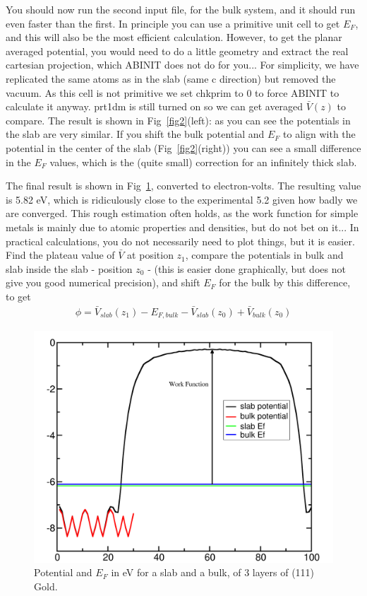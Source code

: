 \documentclass{report}
\begin{document}
You should now run the second input file, for the bulk system, and it should run even faster than the first. In principle you can use a primitive unit cell to get $E_F$, and this will also be the most efficient calculation. However, to get the planar averaged potential, you would need to do a little geometry and extract the real cartesian projection, which ABINIT does not do for you... For simplicity, we have replicated the same atoms as in the slab (same c direction) but removed the vacuum. As this cell is not primitive we set chkprim to 0 to force ABINIT to calculate it anyway. prt1dm is still turned on so we can get averaged $\bar{V}(z)$ to compare. The result is shown in Fig~\ref{fig2}(left): as you can see the potentials in the slab are very similar. If you shift the bulk potential and $E_F$ to align with the potential in the center of the slab (Fig~\ref{fig2}(right)) you can see a small difference in the $E_F$ values, which is the (quite small) correction for an infinitely thick slab.

The final result is shown in Fig~\ref{fig3}, converted to electron-volts. The resulting value is 5.82 eV, which is ridiculously close to the experimental 5.2 given how badly we are converged. This rough estimation often holds, as the work function for simple metals is mainly due to atomic properties and densities, but do not bet on it... In practical calculations, you do not necessarily need to plot things, but it is easier. Find the plateau value of $\bar{V}$ at position $z_1$, compare the potentials in bulk and slab inside the slab - position $z_0$ - (this is easier done graphically, but does not give you good numerical precision), and shift $E_F$ for the bulk by this difference, to get 
\begin{eqnarray}
\phi = \bar{V}_{slab}(z_1) - E_{F,bulk} - \bar{V}_{slab}(z_0) + \bar{V}_{bulk}(z_0)
\end{eqnarray}

\begin{figure}[h]
\begin{center}
\includegraphics[width=0.8\linewidth]{workfunction_image3}
\caption{Potential and $E_F$ in eV for a slab and a bulk, of 3 layers of (111) Gold.}
\label{fig3}
\end{center}
\end{figure}
\end{document}
